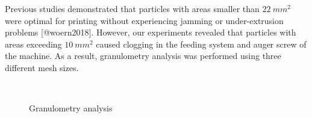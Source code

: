 \documentclass[
  letterpaper,
  DIV=11,
  numbers=noendperiod]{scrartcl}
\begin{document}
Previous studies demonstrated that particles with areas smaller than
\(22~mm^{2}\) were optimal for printing without experiencing jamming or
under-extrusion problems {[}@woern2018{]}. However, our experiments
revealed that particles with areas exceeding \(10~mm^{2}\) caused
clogging in the feeding system and auger screw of the machine. As a
result, granulometry analysis was performed using three different mesh
sizes.

\begin{figure}

\begin{minipage}[t]{0.57\linewidth}

{\centering 


\caption{\label{fig-granulometry}Granulometry analysis}

}

\end{minipage}%
%
\begin{minipage}[t]{0.03\linewidth}

{\centering 

~

}

\end{minipage}%
%
\begin{minipage}[t]{0.40\linewidth}


\end{minipage}
\end{figure}
\end{document}
